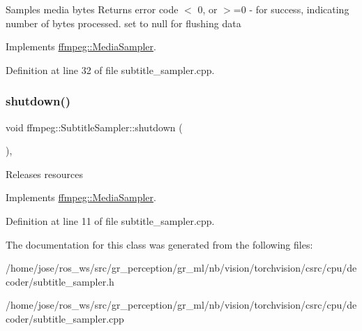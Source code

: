 Samples media bytes Returns error code $<$ 0, or $>$=0 -\/ for success, indicating number of bytes processed. set  to null for flushing data 

Implements \hyperlink{classffmpeg_1_1MediaSampler_a1e13816018edada455769f027cf5e9dd}{ffmpeg\+::\+Media\+Sampler}.



Definition at line 32 of file subtitle\+\_\+sampler.\+cpp.

\mbox{\label{classffmpeg_1_1SubtitleSampler_aa2558e487cd9bb0438c5c95a6808ace7}} 
\subsubsection{\texorpdfstring{shutdown()}{shutdown()}}
{\footnotesize\ttfamily void ffmpeg\+::\+Subtitle\+Sampler\+::shutdown (\begin{DoxyParamCaption}{ }\end{DoxyParamCaption})\hspace{0.3cm}{\ttfamily [override]}, {\ttfamily [virtual]}}

Releases resources 

Implements \hyperlink{classffmpeg_1_1MediaSampler_ac8f2fee9cdf896871776a8202d70edd7}{ffmpeg\+::\+Media\+Sampler}.



Definition at line 11 of file subtitle\+\_\+sampler.\+cpp.



The documentation for this class was generated from the following files\+:\begin{DoxyCompactItemize}
\item 
/home/jose/ros\+\_\+ws/src/gr\+\_\+perception/gr\+\_\+ml/nb/vision/torchvision/csrc/cpu/decoder/subtitle\+\_\+sampler.\+h\item 
/home/jose/ros\+\_\+ws/src/gr\+\_\+perception/gr\+\_\+ml/nb/vision/torchvision/csrc/cpu/decoder/subtitle\+\_\+sampler.\+cpp\end{DoxyCompactItemize}
